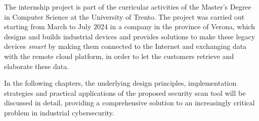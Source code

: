 The internship project is part of the curricular activities of the Master's Degree in Computer Science at the University of Trento. The project was carried out starting from March to July 2024 in a company in the province of Verona, which designs and builds industrial devices and provides solutions to make these legacy devices \textit{smart} by making them connected to the Internet and exchanging data with the remote cloud platform, in order to let the customers retrieve and elaborate these data.

In the following chapters, the underlying design principles, implementation strategies and practical applications of the proposed security scan tool will be discussed in detail, providing a comprehensive solution to an increasingly critical problem in industrial cybersecurity.
